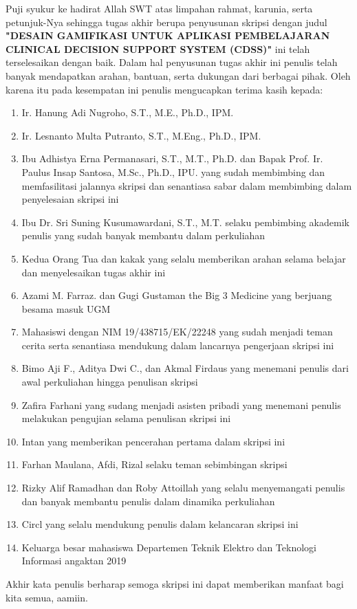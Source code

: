 
Puji syukur ke hadirat Allah SWT atas limpahan rahmat, karunia, serta petunjuk-Nya sehingga tugas akhir berupa penyusunan skripsi 
dengan judul \textbf{"DESAIN GAMIFIKASI UNTUK APLIKASI PEMBELAJARAN CLINICAL DECISION SUPPORT SYSTEM (CDSS)"}
ini telah terselesaikan dengan baik. Dalam hal penyusunan tugas akhir ini penulis telah banyak mendapatkan arahan, bantuan, serta dukungan dari berbagai pihak. 
Oleh karena itu pada kesempatan ini penulis mengucapkan terima kasih kepada:

\begin{enumerate}
	\item Ir. Hanung Adi Nugroho, S.T., M.E., Ph.D., IPM.
	\item Ir. Lesnanto Multa Putranto, S.T., M.Eng., Ph.D., IPM.
	\item Ibu Adhistya Erna Permanasari, S.T., M.T., Ph.D. dan Bapak Prof. Ir. Paulus Insap Santosa, M.Sc., Ph.D., IPU. yang sudah membimbing dan memfasilitasi jalannya skripsi dan senantiasa sabar dalam membimbing dalam penyelesaian skripsi ini
	\item Ibu Dr. Sri Suning Kusumawardani, S.T., M.T. selaku pembimbing akademik penulis yang sudah banyak membantu dalam perkuliahan
	\item Kedua Orang Tua dan kakak yang selalu memberikan arahan selama belajar dan menyelesaikan tugas akhir ini
	\item Azami M. Farraz. dan Gugi Gustaman the Big 3 Medicine yang berjuang besama masuk UGM
	\item Mahasiswi dengan NIM 19/438715/EK/22248 yang sudah menjadi teman cerita serta senantiasa mendukung dalam lancarnya pengerjaan skripsi ini
	\item Bimo Aji F., Aditya Dwi C., dan Akmal Firdaus yang menemani penulis dari awal perkuliahan hingga penulisan skripsi
	\item Zafira Farhani yang sudang menjadi asisten pribadi yang menemani penulis melakukan pengujian selama penulisan skripsi ini
	\item Intan yang memberikan pencerahan pertama dalam skripsi ini
	\item Farhan Maulana, Afdi, Rizal selaku teman sebimbingan skripsi
	\item Rizky Alif Ramadhan dan Roby Attoillah yang selalu menyemangati penulis dan banyak membantu penulis dalam dinamika perkuliahan
	\item Circl yang selalu mendukung penulis dalam kelancaran skripsi ini
	\item Keluarga besar mahasiswa Departemen Teknik Elektro dan Teknologi Informasi angaktan 2019
\end{enumerate}

Akhir kata penulis berharap semoga skripsi ini dapat memberikan manfaat bagi kita semua, aamiin.


